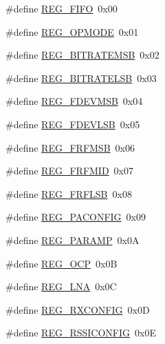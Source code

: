 \begin{DoxyCompactItemize}
\item 
\#define \mbox{\hyperlink{sx1276_regs-_fsk_8h_a8ed1afe4fdc88a0f2626d9ee783e06e5}{R\+E\+G\+\_\+\+F\+I\+FO}}~0x00
\item 
\#define \mbox{\hyperlink{sx1276_regs-_fsk_8h_af3f25ba8cab1ad2c10ee96089d5a21be}{R\+E\+G\+\_\+\+O\+P\+M\+O\+DE}}~0x01
\item 
\#define \mbox{\hyperlink{sx1276_regs-_fsk_8h_a967024927a998c8b00e76015c0444d11}{R\+E\+G\+\_\+\+B\+I\+T\+R\+A\+T\+E\+M\+SB}}~0x02
\item 
\#define \mbox{\hyperlink{sx1276_regs-_fsk_8h_ab7321068986e253c5e0c4c00f592339b}{R\+E\+G\+\_\+\+B\+I\+T\+R\+A\+T\+E\+L\+SB}}~0x03
\item 
\#define \mbox{\hyperlink{sx1276_regs-_fsk_8h_ac9a9ad053f237a88ac9ef4e9f1eb6902}{R\+E\+G\+\_\+\+F\+D\+E\+V\+M\+SB}}~0x04
\item 
\#define \mbox{\hyperlink{sx1276_regs-_fsk_8h_a41b897af0ba110c4450e54887148acda}{R\+E\+G\+\_\+\+F\+D\+E\+V\+L\+SB}}~0x05
\item 
\#define \mbox{\hyperlink{sx1276_regs-_fsk_8h_a80711d5ed54cc1aa69666b92ea78c353}{R\+E\+G\+\_\+\+F\+R\+F\+M\+SB}}~0x06
\item 
\#define \mbox{\hyperlink{sx1276_regs-_fsk_8h_ad80489ab7d36cc8d9c725ab45f77c731}{R\+E\+G\+\_\+\+F\+R\+F\+M\+ID}}~0x07
\item 
\#define \mbox{\hyperlink{sx1276_regs-_fsk_8h_a3f6b75c6bcb9bb8631cd7fa7151dd934}{R\+E\+G\+\_\+\+F\+R\+F\+L\+SB}}~0x08
\item 
\#define \mbox{\hyperlink{sx1276_regs-_fsk_8h_a36b48e41982d4b0d0b6758a5e1ba398e}{R\+E\+G\+\_\+\+P\+A\+C\+O\+N\+F\+IG}}~0x09
\item 
\#define \mbox{\hyperlink{sx1276_regs-_fsk_8h_aff539bfb169523f9feb34a1d28daaa3f}{R\+E\+G\+\_\+\+P\+A\+R\+A\+MP}}~0x0A
\item 
\#define \mbox{\hyperlink{sx1276_regs-_fsk_8h_a4e0e13619868140039378bb218aa5a3b}{R\+E\+G\+\_\+\+O\+CP}}~0x0B
\item 
\#define \mbox{\hyperlink{sx1276_regs-_fsk_8h_ab08aa4c56ad75b3e715a1115330109ca}{R\+E\+G\+\_\+\+L\+NA}}~0x0C
\item 
\#define \mbox{\hyperlink{sx1276_regs-_fsk_8h_a6bba52e363d49d2783439eb8062d90c8}{R\+E\+G\+\_\+\+R\+X\+C\+O\+N\+F\+IG}}~0x0D
\item 
\#define \mbox{\hyperlink{sx1276_regs-_fsk_8h_a9ba1a67481c3ba0a454cb4873e4db10b}{R\+E\+G\+\_\+\+R\+S\+S\+I\+C\+O\+N\+F\+IG}}~0x0E
\item 

\end{DoxyCompactItemize}

